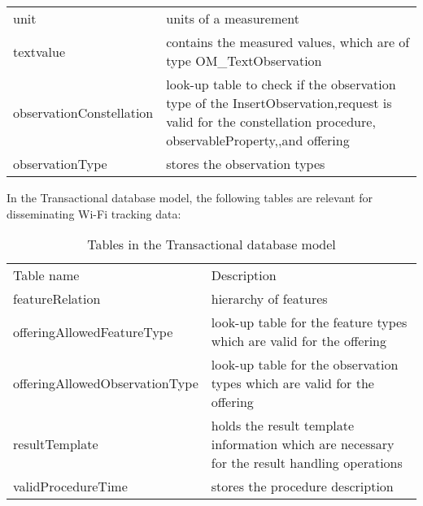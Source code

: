 \begin{table}[]
\begin{tabular}{@{}ll@{}}
unit                       & units of a measurement                                                                                                                                     \\
textvalue                  & contains the measured values, which are of type OM\_TextObservation                                                                                        \\
observationConstellation   & look-up table to check if the observation type of the InsertObservation,request is valid for the constellation procedure, observableProperty,,and offering \\
observationType            & stores the observation types                                                                                                                               \\ \bottomrule
\end{tabular}
\end{table}

In the Transactional database model, the following tables are relevant for disseminating
Wi-Fi tracking data:

\begin{table}[]
\centering
\caption{Tables in the Transactional database model}
\label{my-label}
\begin{tabular}{@{}ll@{}}
\toprule
Table name                     & Description                                                                                  \\
featureRelation                & hierarchy of features                                                                        \\
offeringAllowedFeatureType     & look-up table for the feature types which are valid for the offering                         \\
offeringAllowedObservationType & look-up table for the observation types which are valid for the offering                     \\
resultTemplate                 & holds the result template information which are necessary for the result handling operations \\
validProcedureTime             & stores the procedure description                                                            
\end{tabular}
\end{table}

